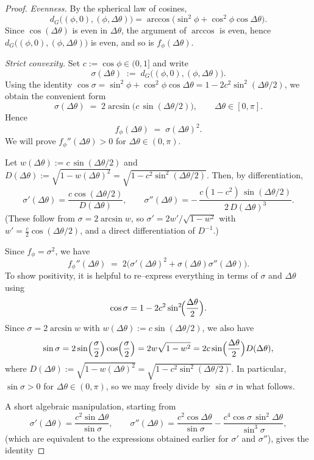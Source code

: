 \documentclass[12pt, reqno]{amsart}
\theoremstyle{plain}
\theoremstyle{definition}
\begin{document}
\begin{proof}
\emph{Evenness.} By the spherical law of cosines,
\[
d_G\!\big((\phi,0),(\phi,\Delta\theta)\big)
= \arccos\!\Big(\sin^2\phi+\cos^2\phi\cos\Delta\theta\Big).
\]
Since $\cos(\Delta\theta)$ is even in $\Delta\theta$, the argument of $\arccos$ is even, hence
$d_G\big((\phi,0),(\phi,\Delta\theta)\big)$ is even, and so is $f_\phi(\Delta\theta)$.

\medskip
\emph{Strict convexity.} Set $c:=\cos\phi\in(0,1]$ and write
\[
\sigma(\Delta\theta)
\;:=\; d_G\!\big((\phi,0),(\phi,\Delta\theta)\big).
\]
Using the identity $\cos\sigma
=\sin^2\phi+\cos^2\phi\cos\Delta\theta
=1-2c^2\sin^2(\Delta\theta/2)$, we obtain the convenient form
\[
\sigma(\Delta\theta)\;=\;2\arcsin\!\big(c\,\sin(\Delta\theta/2)\big),\qquad \Delta\theta\in[0,\pi].
\]
Hence
\[
f_\phi(\Delta\theta)\;=\;\sigma(\Delta\theta)^2.
\]
We will prove $f_\phi''(\Delta\theta)>0$ for $\Delta\theta\in(0,\pi)$.

Let $w(\Delta\theta):=c\,\sin(\Delta\theta/2)$ and $D(\Delta\theta):=\sqrt{1-w(\Delta\theta)^2}
=\sqrt{1-c^2\sin^2(\Delta\theta/2)}$. Then, by differentiation,
\[
\sigma'(\Delta\theta)
=\frac{c\cos(\Delta\theta/2)}{D(\Delta\theta)},
\qquad
\sigma''(\Delta\theta)
=-\,\frac{c(1-c^2)\,\sin(\Delta\theta/2)}{2\,D(\Delta\theta)^3}.
\]
(These follow from $\sigma=2\arcsin w$, so $\sigma'=2w'/\sqrt{1-w^2}$ with
$w'= \tfrac{c}{2}\cos(\Delta\theta/2)$, and a direct differentiation of $D^{-1}$.)

Since $f_\phi=\sigma^2$, we have
\[
f_\phi''(\Delta\theta)\;=\;2\big(\sigma'(\Delta\theta)^2+\sigma(\Delta\theta)\sigma''(\Delta\theta)\big).
\]
To show positivity, it is helpful to re–express everything in terms of $\sigma$ and $\Delta\theta$ using
\[
\cos \sigma = 1 - 2c^{2}\sin^{2}\!\Bigl(\frac{\Delta\theta}{2}\Bigr).
\]
Since $\sigma = 2\arcsin w$ with $w(\Delta\theta) := c\sin(\Delta\theta/2)$, we also have
\[
\sin\sigma
 = 2\sin\Bigl(\frac{\sigma}{2}\Bigr)\cos\Bigl(\frac{\sigma}{2}\Bigr)
 = 2w\sqrt{1-w^{2}}
 = 2c\sin\Bigl(\frac{\Delta\theta}{2}\Bigr)D(\Delta\theta),
\]
where $D(\Delta\theta) := \sqrt{1-w(\Delta\theta)^{2}} = \sqrt{1-c^{2}\sin^{2}(\Delta\theta/2)}$.
In particular, $\sin\sigma > 0$ for $\Delta\theta \in (0,\pi)$, so we may freely divide by $\sin\sigma$ in what follows.

A short algebraic manipulation, starting from
\[
\sigma'(\Delta\theta)
 = \frac{c^{2}\sin\Delta\theta}{\sin\sigma},
\qquad
\sigma''(\Delta\theta)
 = \frac{c^{2}\cos\Delta\theta}{\sin\sigma}
   - \frac{c^{4}\cos\sigma\,\sin^{2}\Delta\theta}{\sin^{3}\sigma},
\]
(which are equivalent to the expressions obtained earlier for $\sigma'$ and $\sigma''$),
gives the identity




\end{proof}
\end{document}
